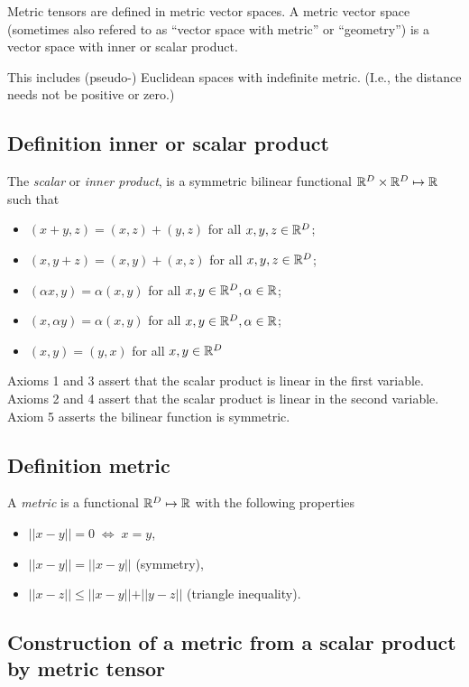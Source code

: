 Metric tensors are defined in metric vector spaces.
A metric vector space (sometimes also refered to
as ``vector space with metric'' or ``geometry'')
is a vector space with inner or scalar product.

This includes (pseudo-) Euclidean spaces with indefinite metric.
(I.e., the distance needs not be positive or zero.)


\subsection{Definition inner or scalar product}


The {\em scalar} or {\em inner product},
is a symmetric bilinear functional
 ${\Bbb R}^D\times {\Bbb R}^D\mapsto {\Bbb R}$
such that
\begin{itemize}
\item
$(x+y,z)=(x,z)+(y,z)$ for all $x,y,z \in {\Bbb R}^D$;
\item
$(x,y+z)=(x,y)+(x,z)$ for all $x,y,z \in {\Bbb R}^D$;
\item
$(\alpha x,y)=\alpha (x,y)$ for all $x,y \in {\Bbb R}^D, \alpha \in {\Bbb R}$;
\item
$(x,\alpha y)=\alpha (x,y)$ for all $x,y \in {\Bbb R}^D, \alpha \in {\Bbb R}$;
\item
$(x,y)={(y,x)} $ for all $x,y \in {\Bbb R}^D$
\end{itemize}
Axioms 1 and 3 assert that the scalar product is linear in the first variable.
Axioms 2 and 4 assert that the scalar product is linear in the second variable.
Axiom 5 asserts the bilinear function is symmetric.


\subsection{Definition metric}

A {\em metric} is a functional ${\Bbb R}^D\mapsto {\Bbb R}$
with the following properties
\begin{itemize}
\item
$\vert\vert x -y \vert\vert =0 \; \Longleftrightarrow \; x = y$,
\item
$\vert\vert x- y\vert\vert  =\vert\vert  x- y\vert\vert $  (symmetry),
\item
$\vert\vert x-z\vert\vert  \le \vert\vert x- y\vert\vert  + \vert\vert  y- z\vert\vert $  (triangle
inequality).
\end{itemize}



\subsection{Construction of a metric from a scalar product by metric tensor}


